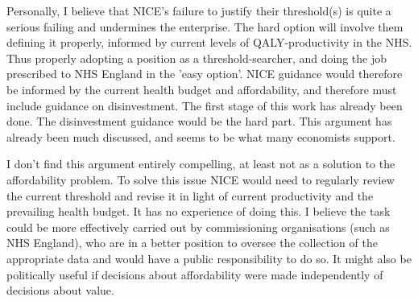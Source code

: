 Personally, I believe that NICE's failure to justify their threshold(s) is quite a serious failing and undermines the enterprise. The hard option will involve them defining it properly, informed by current levels of QALY-productivity in the NHS. Thus properly adopting a position as a threshold-searcher\cite{Culyer_2007}, and doing the job prescribed to NHS England in the 'easy option'. NICE guidance would therefore be informed by the current health budget and affordability, and therefore must include guidance on disinvestment. The first stage of this work has already been done\cite{claxton2013methods}. The disinvestment guidance would be the hard part. This argument has already been much discussed, and seems to be what many economists support\cite{Claxton_2014,Raftery_2009,McCabe_2008}.

I don't find this argument entirely compelling, at least not as a solution to the affordability problem. To solve this issue NICE would need to regularly review the current threshold and revise it in light of current productivity and the prevailing health budget. It has no experience of doing this. I believe the task could be more effectively carried out by commissioning organisations (such as NHS England), who are in a better position to oversee the collection of the appropriate data and would have a public responsibility to do so. It might also be politically useful if decisions about affordability were made independently of decisions about value.